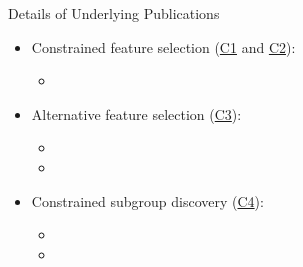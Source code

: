 \documentclass[en, navbarinline, handout]{sdqbeamer}
\begin{document}
\begin{frame}[t]{Details of Underlying Publications}
	\begin{itemize}
		\item Constrained feature selection (\hyperlink{slide:contributions}{C1} and \hyperlink{slide:contributions}{C2}):
		\begin{itemize}
			\item {}
		\end{itemize}
		\item Alternative feature selection (\hyperlink{slide:contributions}{C3}):
		\begin{itemize}
			\item {}
			\item {}
		\end{itemize}
		\item Constrained subgroup discovery (\hyperlink{slide:contributions}{C4}):
		\begin{itemize}
			\item {}
			\item {}
		\end{itemize}
	\end{itemize}
\end{frame}
\end{document}
